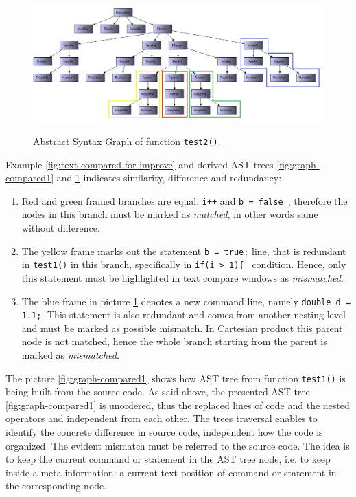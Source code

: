\documentclass{report}
\begin{document}
\begin{figure}[h]
  \centering
  \includegraphics[width=1.00\textwidth]{Figures/text-to-text/graph-compared2.png}\\[0.1cm]
  \caption[Abstract Syntax Graph  of function \texttt{test2()}]{Abstract Syntax Graph  of function \texttt{test2()}.}
  \label{fig:graph-compared2}
\end{figure}

Example \ref{fig:text-compared-for-improve} and derived AST trees \ref{fig:graph-compared1} and  \ref{fig:graph-compared2} indicates similarity, difference and redundancy:
\begin{enumerate}
  \item Red and green framed branches are equal: \texttt{i++} and \texttt{b = false }, therefore the nodes in this branch must be marked as \emph{matched}, in other words same without difference. 
  
  \item The yellow frame marks out the statement \texttt{b = true;} line, that is redundant in \texttt{test1()} in this branch, specifically in \texttt{if(i > 1)\{ } condition. Hence, only this statement must be highlighted in text compare windows as \emph{mismatched}. 
  
  \item The blue frame in picture \ref{fig:graph-compared2} denotes a new command line, namely \texttt{double d = 1.1;}. This statement is also redundant and comes from another nesting level and must be marked as possible mismatch. In Cartesian product this parent node is not matched, hence the whole branch starting from the parent is marked as \emph{mismatched}.

\end{enumerate}

The picture \ref{fig:graph-compared1} shows how AST tree from function \texttt{test1()} is being built from the source code. As said above, the presented AST tree \ref{fig:graph-compared1} is unordered, thus the replaced lines of code and the nested operators and independent from each other. The trees traversal enables to identify the concrete difference in source code, independent how the code is organized. The evident mismatch must be referred to the source code. The idea is to keep the current command or statement in the AST tree node, i.e. to keep inside a meta-information: a current text position of command or statement in the corresponding node. 
\end{document}
